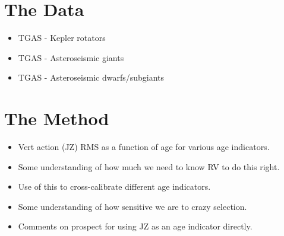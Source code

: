 \documentclass[useAMS, usenatbib, preprint, 12pt]{aastex}
\begin{document}

\section{The Data}

\begin{itemize}
    \item{TGAS - Kepler rotators}
    \item{TGAS - Asteroseismic giants}
    \item{TGAS - Asteroseismic dwarfs/subgiants}
\end{itemize}

\section{The Method}

\begin{itemize}
    \item{Vert action (JZ) RMS as a function of age for various age
        indicators.}
    \item{Some understanding of how much we need to know RV to do this right.}
    \item{Use of this to cross-calibrate different age indicators.}
    \item{Some understanding of how sensitive we are to crazy selection.}
    \item{Comments on prospect for using JZ as an age indicator directly.}
\end{itemize}
\end{document}
